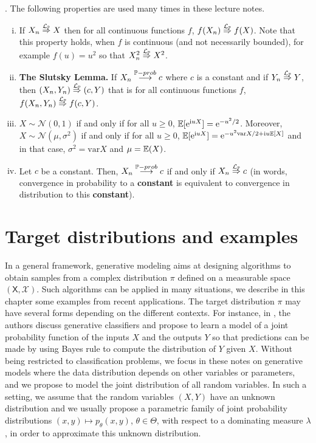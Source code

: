 \documentclass[english,graybox,envcountchap,envcountsame,sectrefs,shortlabels]{svmono}
\theoremstyle{style}
\newcommand{\weaklim}{\ensuremath{\stackrel{\mathcal{L}_{\PP}}{\Rightarrow}}}
\newcommand{\rme}{\mathrm{e}}
\newcommand{\rmi}{\mathrm{i}}
\newcommand{\plim}[1]{\stackrel{#1-prob}{\longrightarrow}}
\newcommand{\gauss}{\mathcal{N}}
\begin{document}
.
\newcommand{\var}{\mathrm{var}}
The following properties are used many times in these lecture notes.
\begin{enumerate}[(i)]
\item If $X_n \weaklim X$ then for all continuous functions $f$, $f(X_n) \weaklim f(X)$. Note that this property  holds, when $f$ is continuous (and not necessarily bounded), for example $f(u)=u^2$ so that $X_n^2 \weaklim X^2$.
\item \textbf{The Slutsky Lemma.} If $X_n \plim{\PP} c$ where $c$ is a constant and if $Y_n \weaklim Y$, then $(X_n,Y_n) \weaklim (c,Y)$ that is for all continuous functions $f$, $f(X_n,Y_n) \weaklim f(c,Y)$.
\item $X \sim \gauss(0,1)$ if and only if for all $u \geq 0$, $\PE[\rme^{\rmi u
    X}]=\rme^{-u^2/2}$. Moreover, $X \sim \gauss(\mu,\sigma^2)$ if and only if
  for all $u \geq 0$, $\PE[\rme^{\rmi u X}]=\rme^{-u^2 \var{X}/2+\rmi
    u \PE[X]}$ and in that case, $\sigma^2=\var{X}$ and $\mu=\mathbb{E}(X)$.
 \item Let $c$ be a constant. Then, $X_n \plim{\PP} c$ if and only if $X_n \weaklim c$ (in words, convergence
   in probability to a {\bf constant} is equivalent to convergence in
   distribution to this {\bf constant}).
\end{enumerate}



\dominitoc
\tableofcontents


\chapter{Target distributions and examples}
In a general framework, generative modeling aims at designing algorithms to obtain samples from a complex distribution $\pi$ defined on a measurable space $(\mathsf{X},\mathcal{X})$. Such algorithms can be applied in many situations, we describe in this chapter some examples from recent applications. The target distribution $\pi$ may have several forms depending on the different contexts.
 For instance, in \cite{ng2001discriminative}, the authors discuss generative classifiers and propose to learn a model of a joint probability function of the inputs $X$ and the outputs $Y$ so that predictions can be made by using Bayes rule to compute the distribution of $Y$ given $X$. Without being restricted to classification problems, we focus in these notes on generative models where the data distribution depends on other variables or parameters, and we propose to model the joint distribution of all random variables. In such a setting, we assume that the random variables $(X,Y)$ have an unknown distribution and we usually propose a parametric family of joint probability distributions $(x,y)\mapsto p_\theta(x,y)$, $\theta\in\Theta$, with respect to a dominating measure $\lambda$, in order to approximate this unknown distribution. 
\end{document}
